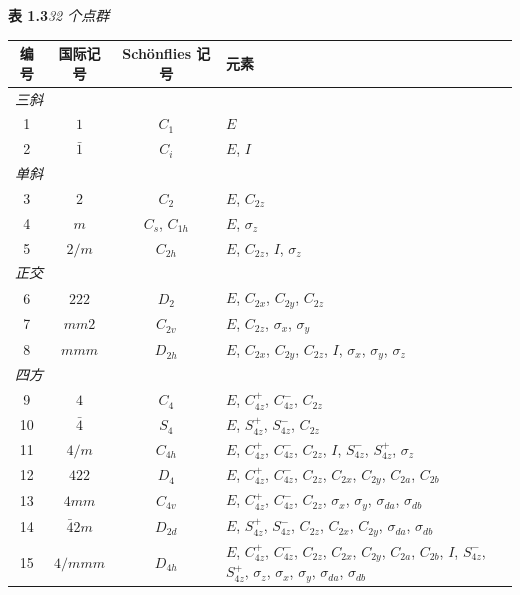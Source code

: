 \begin{table}[H]
\centering
\textbf{表 1.3}\quad \textit{32 个点群}

\smallskip
\begin{tabular}{|c|c|c|p{}|}
\hline
编号 & 国际记号 & Schönflies 记号 & 元素 \\ \hline
\multicolumn{4}{|l|}{\textit{三斜}} \\ \hline
1 & $1$ & $C_{1}$ & $E$ \\ \hline
2 & $\bar{1}$ & $C_{i}$ & $E$, $I$ \\ \hline
\multicolumn{4}{|l|}{\textit{单斜}} \\ \hline
3 & $2$ & $C_{2}$ & $E$, $C_{2z}$ \\ \hline
4 & $m$ & $C_{s}$, $C_{1h}$ & $E$, $\sigma_{z}$ \\ \hline
5 & $2/m$ & $C_{2h}$ & $E$, $C_{2z}$, $I$, $\sigma_{z}$ \\ \hline
\multicolumn{4}{|l|}{\textit{正交}} \\ \hline
6 & $222$ & $D_{2}$ & $E$, $C_{2x}$, $C_{2y}$, $C_{2z}$ \\ \hline
7 & $mm2$ & $C_{2v}$ & $E$, $C_{2z}$, $\sigma_{x}$, $\sigma_{y}$ \\ \hline
8 & $mmm$ & $D_{2h}$ & $E$, $C_{2x}$, $C_{2y}$, $C_{2z}$, $I$, $\sigma_{x}$, $\sigma_{y}$, $\sigma_{z}$ \\ \hline
\multicolumn{4}{|l|}{\textit{四方}} \\ \hline
9 & $4$ & $C_{4}$ & $E$, $C_{4z}^{+}$, $C_{4z}^{-}$, $C_{2z}$ \\ \hline
10 & $\bar{4}$ & $S_{4}$ & $E$, $S_{4z}^{+}$, $S_{4z}^{-}$, $C_{2z}$ \\ \hline
11 & $4/m$ & $C_{4h}$ & $E$, $C_{4z}^{+}$, $C_{4z}^{-}$, $C_{2z}$, $I$, $S_{4z}^{-}$, $S_{4z}^{+}$, $\sigma_{z}$ \\ \hline
12 & $422$ & $D_{4}$ & $E$, $C_{4z}^{+}$, $C_{4z}^{-}$, $C_{2z}$, $C_{2x}$, $C_{2y}$, $C_{2a}$, $C_{2b}$ \\ \hline
13 & $4mm$ & $C_{4v}$ & $E$, $C_{4z}^{+}$, $C_{4z}^{-}$, $C_{2z}$, $\sigma_{x}$, $\sigma_{y}$, $\sigma_{da}$, $\sigma_{db}$ \\ \hline
14 & $\bar{4}2m$ & $D_{2d}$ & $E$, $S_{4z}^{+}$, $S_{4z}^{-}$, $C_{2z}$, $C_{2x}$, $C_{2y}$, $\sigma_{da}$, $\sigma_{db}$ \\ \hline
15 & $4/mmm$ & $D_{4h}$ & $E$, $C_{4z}^{+}$, $C_{4z}^{-}$, $C_{2z}$, $C_{2x}$, $C_{2y}$, $C_{2a}$, $C_{2b}$, $I$, $S_{4z}^{-}$, $S_{4z}^{+}$, $\sigma_{z}$, $\sigma_{x}$, $\sigma_{y}$, $\sigma_{da}$, $\sigma_{db}$ \\ \hline

\end{tabular}
\end{table}
